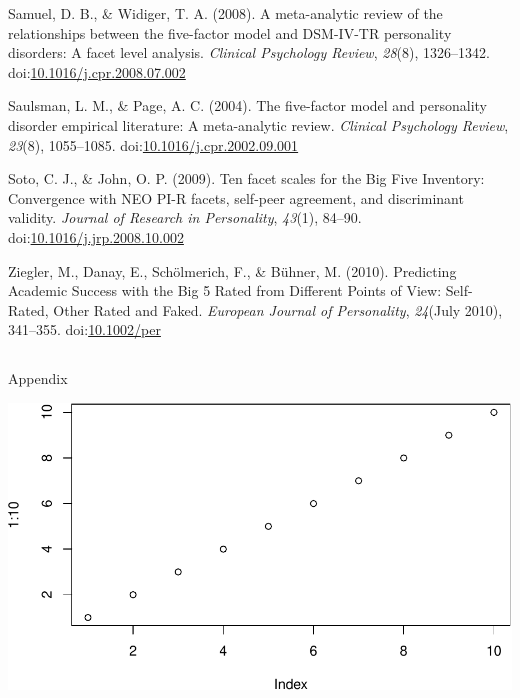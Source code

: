 \documentclass[,man]{apa6}
\theoremstyle{definition}
\theoremstyle{definition}
\theoremstyle{definition}
\theoremstyle{remark}
\begin{document}
\leavevmode\hypertarget{ref-SamuelWidiger2008}{}%
Samuel, D. B., \& Widiger, T. A. (2008). A meta-analytic review of the
relationships between the five-factor model and DSM-IV-TR personality
disorders: A facet level analysis. \emph{Clinical Psychology Review},
\emph{28}(8), 1326--1342.
doi:\href{https://doi.org/10.1016/j.cpr.2008.07.002}{10.1016/j.cpr.2008.07.002}

\leavevmode\hypertarget{ref-SaulsmanPage2004}{}%
Saulsman, L. M., \& Page, A. C. (2004). The five-factor model and
personality disorder empirical literature: A meta-analytic review.
\emph{Clinical Psychology Review}, \emph{23}(8), 1055--1085.
doi:\href{https://doi.org/10.1016/j.cpr.2002.09.001}{10.1016/j.cpr.2002.09.001}

\leavevmode\hypertarget{ref-SotoJohn2009}{}%
Soto, C. J., \& John, O. P. (2009). Ten facet scales for the Big Five
Inventory: Convergence with NEO PI-R facets, self-peer agreement, and
discriminant validity. \emph{Journal of Research in Personality},
\emph{43}(1), 84--90.
doi:\href{https://doi.org/10.1016/j.jrp.2008.10.002}{10.1016/j.jrp.2008.10.002}

\leavevmode\hypertarget{ref-Ziegler2010}{}%
Ziegler, M., Danay, E., Schölmerich, F., \& Bühner, M. (2010).
Predicting Academic Success with the Big 5 Rated from Different Points
of View: Self-Rated, Other Rated and Faked. \emph{European Journal of
Personality}, \emph{24}(July 2010), 341--355.
doi:\href{https://doi.org/10.1002/per}{10.1002/per}

\endgroup

\clearpage
\makeatletter
\efloat@restorefloats
\makeatother


\begin{appendix}
\section{}
Appendix

\includegraphics{IPIP_draft_files/figure-latex/unnamed-chunk-2-1.pdf}
\end{appendix}
\end{document}
